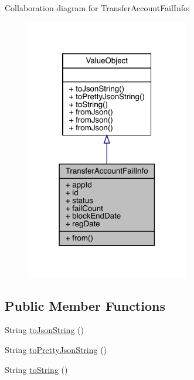 Collaboration diagram for Transfer\+Account\+Fail\+Info\+:
\nopagebreak
\begin{figure}[H]
\begin{center}
\leavevmode
\includegraphics[width=202pt]{classcom_1_1toast_1_1android_1_1gamebase_1_1auth_1_1transfer_1_1data_1_1_transfer_account_fail_info__coll__graph}
\end{center}
\end{figure}
\subsection*{Public Member Functions}
\begin{DoxyCompactItemize}
\item 
String \hyperlink{classcom_1_1toast_1_1android_1_1gamebase_1_1base_1_1_value_object_a58acf6402880e9769d79d8667581fa6a}{to\+Json\+String} ()
\item 
String \hyperlink{classcom_1_1toast_1_1android_1_1gamebase_1_1base_1_1_value_object_a054431f3d988a22295cfc8b784ff2637}{to\+Pretty\+Json\+String} ()
\item 
String \hyperlink{classcom_1_1toast_1_1android_1_1gamebase_1_1base_1_1_value_object_ad146fa8579a5f8a876c4688cc5a68520}{to\+String} ()
\end{DoxyCompactItemize}

